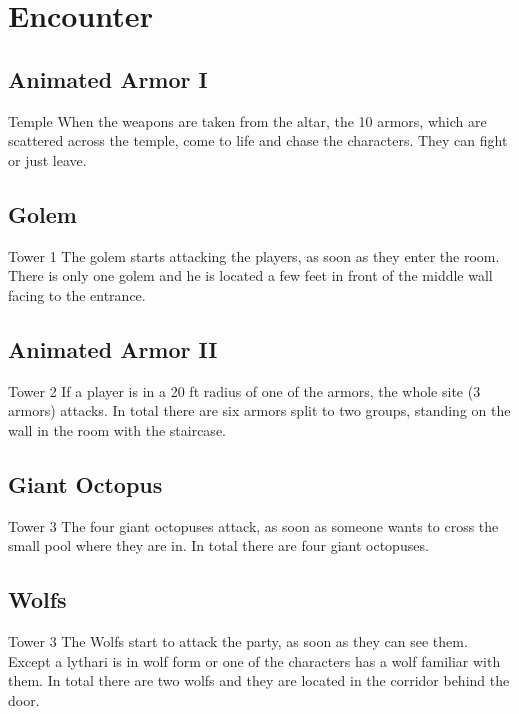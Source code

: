\documentclass[a4paper,10pt,twoside,twocolumn,bg=print]{dndbook} %
\begin{document}
	\section{Encounter}
		\subsection{Animated Armor I}
			Temple\linebreak
			When the weapons are taken from the altar, the 10 armors, which are scattered across the temple, come to life and chase the characters. They can fight or just leave.
		\subsection{Golem}
			Tower 1\linebreak
			The golem starts attacking the players, as soon as they enter the room. There is only one golem and he is located a few feet in front of the middle wall facing to the entrance.
		\subsection{Animated Armor II}
			Tower 2\linebreak
			If a player is in a 20 ft radius of one of the armors, the whole site (3 armors) attacks. In total there are six armors split to two groups, standing on the wall in the room with the staircase.
		\subsection{Giant Octopus}
			Tower 3\linebreak
			The four giant octopuses attack, as soon as someone wants to cross the small pool where they are in. In total there are four giant octopuses.
		\subsection{Wolfs}
			Tower 3\linebreak
			The Wolfs start to attack the party, as soon as they can see them. Except a lythari is in wolf form or one of the characters has a wolf familiar with them. In total there are two wolfs and they are located in the corridor behind the door.
	\vfill
	\pagebreak
\end{document}
